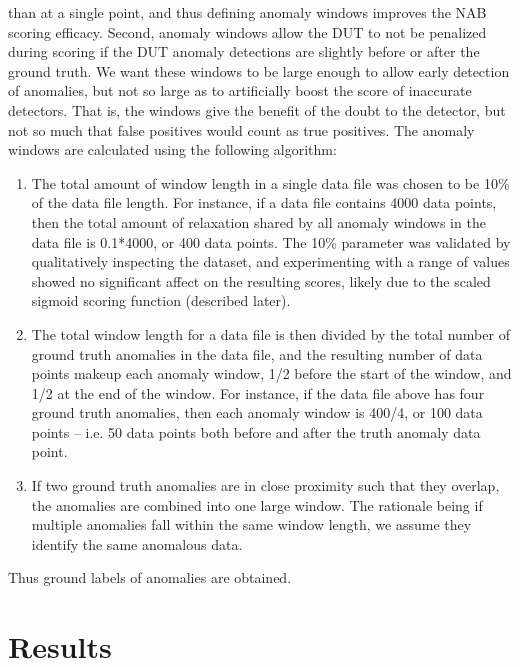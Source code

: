 \documentclass[12pt]{article}
\begin{document}
than at a single point, and thus defining anomaly windows improves the
NAB scoring efficacy. Second, anomaly windows allow the DUT to not be
penalized during scoring if the DUT anomaly detections are slightly before
or after the ground truth. We want these windows to be large enough to
allow early detection of anomalies, but not so large as to artificially boost
the score of inaccurate detectors. That is, the windows give the benefit of
the doubt to the detector, but not so much that false positives would count
as true positives. The anomaly windows are calculated using the following
algorithm:
\begin{enumerate}
\item The total amount of window length in a single data file was chosen
to be 10\% of the data file length. For instance, if a data file contains
4000 data points, then the total amount of relaxation shared by all
anomaly windows in the data file is 0.1*4000, or 400 data points.
The 10\% parameter was validated by qualitatively inspecting the
dataset, and experimenting with a range of values showed no
significant affect on the resulting scores, likely due to the scaled
sigmoid scoring function (described later).
\item The total window length for a data file is then divided by the total
number of ground truth anomalies in the data file, and the resulting
number of data points makeup each anomaly window, 1/2 before
the start of the window, and 1/2 at the end of the window. For
instance, if the data file above has four ground truth anomalies,
then each anomaly window is 400/4, or 100 data points – i.e. 50
data points both before and after the truth anomaly data point.
\item If two ground truth anomalies are in close proximity such that they
overlap, the anomalies are combined into one large window. The
rationale being if multiple anomalies fall within the same window
length, we assume they identify the same anomalous data.
\end{enumerate}
Thus ground labels of anomalies are obtained. 

\newpage
\section{Results}
\end{document}
